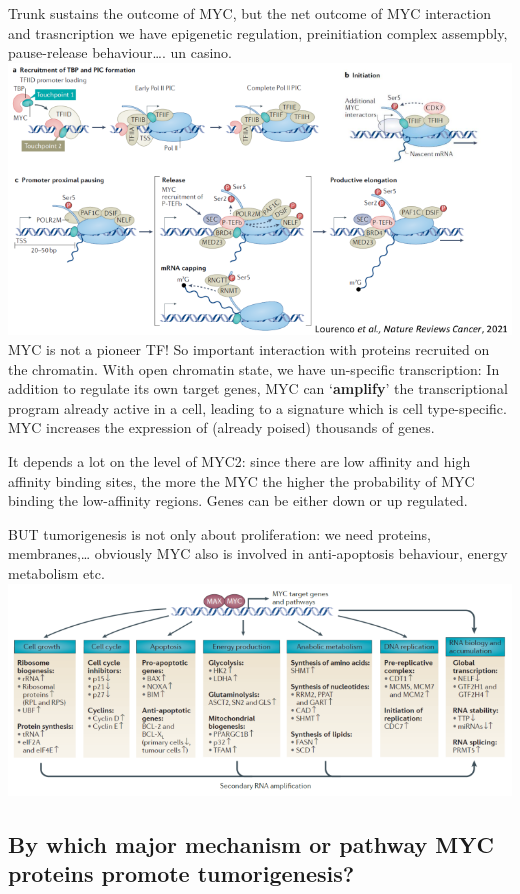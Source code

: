 Trunk sustains the outcome of MYC, but the net outcome of MYC interaction and trasncription we have epigenetic regulation, preinitiation complex assempbly, pause-release behaviour\ldots. un casino.
\includegraphics{../_resources/10a2ad3114504053030a1071443aabd7.png}
MYC is not a pioneer TF! So important interaction with proteins recruited on the chromatin.
With open chromatin state, we have un-specific transcription: In addition to regulate its own target genes, MYC can `\textbf{amplify}' the transcriptional program already active in a cell, leading to a signature which is cell type-specific. MYC increases the expression of (already poised) thousands of genes.

It depends a lot on the level of MYC2: since there are low affinity and high affinity binding sites, the more the MYC the higher the probability of MYC binding the low-affinity regions. Genes can be either down or up regulated.

BUT tumorigenesis is not only about proliferation: we need proteins, membranes,\ldots{} obviously MYC also is involved in anti-apoptosis behaviour, energy metabolism etc.
\includegraphics{../_resources/cdb9692b7dd2ca7bcfae696cd1b1ce36.png}

\hypertarget{by-which-major-mechanism-or-pathway-myc-proteins-promote-tumorigenesis}{%
\subsection{By which major mechanism or pathway MYC proteins promote tumorigenesis?}\label{by-which-major-mechanism-or-pathway-myc-proteins-promote-tumorigenesis}}

